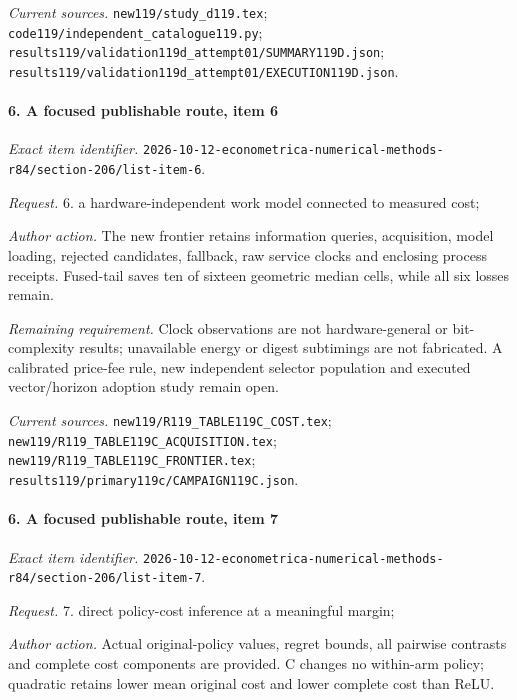 \par\emph{Current sources.} \nolinkurl{new119/study_d119.tex}; \nolinkurl{code119/independent_catalogue119.py}; \nolinkurl{results119/validation119d_attempt01/SUMMARY119D.json}; \nolinkurl{results119/validation119d_attempt01/EXECUTION119D.json}.

\paragraph{6. A focused publishable route, item 6}

\emph{Exact item identifier.} \nolinkurl{2026-10-12-econometrica-numerical-methods-r84/section-206/list-item-6}.

\par\emph{Request.} 6. a hardware-independent work model connected to measured cost;

\par\emph{Author action.} The new frontier retains information queries, acquisition, model loading, rejected candidates, fallback, raw service clocks and enclosing process receipts. Fused-tail saves ten of sixteen geometric median cells, while all six losses remain.

\par\emph{Remaining requirement.} Clock observations are not hardware-general or bit-complexity results; unavailable energy or digest subtimings are not fabricated. A calibrated price-fee rule, new independent selector population and executed vector/\allowbreak{}horizon adoption study remain open.

\par\emph{Current sources.} \nolinkurl{new119/R119_TABLE119C_COST.tex}; \nolinkurl{new119/R119_TABLE119C_ACQUISITION.tex}; \nolinkurl{new119/R119_TABLE119C_FRONTIER.tex}; \nolinkurl{results119/primary119c/CAMPAIGN119C.json}.

\paragraph{6. A focused publishable route, item 7}

\emph{Exact item identifier.} \nolinkurl{2026-10-12-econometrica-numerical-methods-r84/section-206/list-item-7}.

\par\emph{Request.} 7. direct policy-cost inference at a meaningful margin;

\par\emph{Author action.} Actual original-policy values, regret bounds, all pairwise contrasts and complete cost components are provided. C changes no within-arm policy; quadratic retains lower mean original cost and lower complete cost than ReLU.

